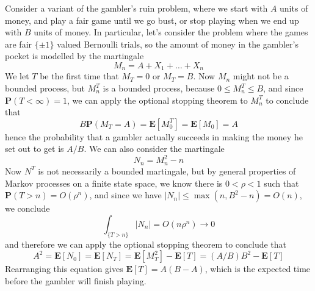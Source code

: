 \begin{example}
    Consider a variant of the gambler's ruin problem, where we start with $A$ units of money, and play a fair game until we go bust, or stop playing when we end up with $B$ units of money. In particular, let's consider the problem where the games are fair $\{ \pm 1 \}$ valued Bernoulli trials, so the amount of money in the gambler's pocket is modelled by the martingale
    \[ M_n = A + X_1 + \dots + X_n \]
    We let $T$ be the first time that $M_T = 0$ or $M_T = B$. Now $M_n$ might not be a bounded process, but $M_n^T$ is a bounded process, because $0 \leq M_n^T \leq B$, and since $\mathbf{P}(T < \infty) = 1$, we can apply the optional stopping theorem to $M_n^T$ to conclude that
    \[ B \mathbf{P}(M_T = A) = \mathbf{E}[M^T_0] = \mathbf{E}[M_0] = A \]
    hence the probability that a gambler actually succeeds in making the money he set out to get is $A/B$. We can also consider the martingale
    \[ N_n = M_n^2 - n \]
    Now $N^T$ is not necessarily a bounded martingale, but by general properties of Markov processes on a finite state space, we know there is $0 < \rho < 1$ such that $\mathbf{P}(T > n) = O(\rho^n)$, and since we have $|N_n| \leq \max(n,B^2 - n) = O(n)$, we conclude
    \[ \int_{\{ T > n \}} |N_n| = O(n \rho^n) \to 0 \]
    and therefore we can apply the optional stopping theorem to conclude that
    \[ A^2 = \mathbf{E}[N_0] = \mathbf{E}[N_T] = \mathbf{E}[M_T^2] - \mathbf{E}[T] = (A/B) B^2 - \mathbf{E}[T] \]
    Rearranging this equation gives $\mathbf{E}[T] = A(B - A)$, which is the expected time before the gambler will finish playing.
\end{example}

